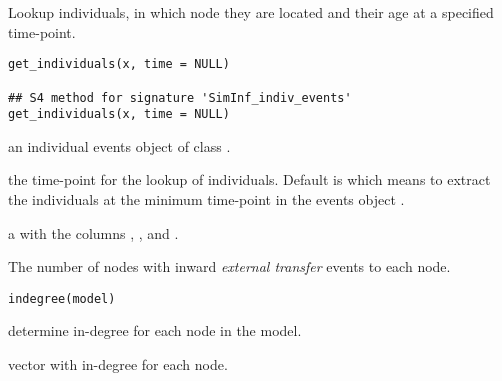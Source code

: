 \documentclass[letterpaper]{book}
\begin{document}
%
\begin{Description}
Lookup individuals, in which node they are located and their age
at a specified time-point.
\end{Description}
%
\begin{Usage}
\begin{verbatim}
get_individuals(x, time = NULL)

## S4 method for signature 'SimInf_indiv_events'
get_individuals(x, time = NULL)
\end{verbatim}
\end{Usage}
%
\begin{Arguments}
\begin{ldescription}
\item[\code{x}] an individual events object of class
.

\item[\code{time}] the time-point for the lookup of individuals. Default
is  which means to extract the individuals at the
minimum time-point in the events object .
\end{ldescription}
\end{Arguments}
%
\begin{Value}
a  with the columns ,
, and .
\end{Value}
%
\begin{Description}
The number of nodes with inward \emph{external transfer} events to
each node.
\end{Description}
%
\begin{Usage}
\begin{verbatim}
indegree(model)
\end{verbatim}
\end{Usage}
%
\begin{Arguments}
\begin{ldescription}
\item[\code{model}] determine in-degree for each node in the model.
\end{ldescription}
\end{Arguments}
%
\begin{Value}
vector with in-degree for each node.
\end{Value}
\end{document}
